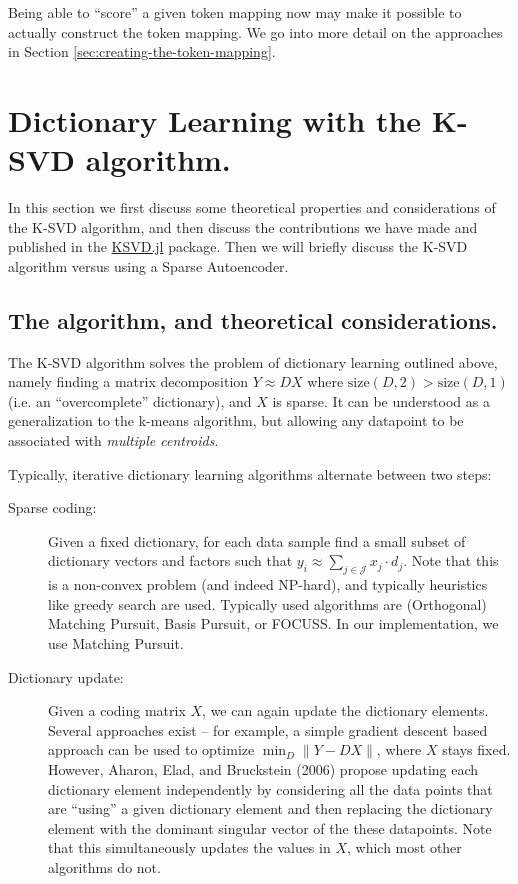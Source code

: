 \documentclass[11pt]{article}
\makeatletter
\newcommand{\cslcitation}[2]
 {\protect\hyper@linkstart{cite}{citeproc_bib_item_#1}#2\hyper@linkend}
\makeatother
\begin{document}
Being able to ``score'' a given token mapping now may make it possible to actually construct the token mapping.
We go into more detail on the approaches in Section \ref{sec:creating-the-token-mapping}.
\section{Dictionary Learning with the K-SVD algorithm. \label{sec:ksvd-algorithm}}
\label{sec:org5f20c96}
In this section we first discuss some theoretical properties and considerations of the K-SVD algorithm, and then discuss the contributions we have made and published in the \href{https://github.com/RomeoV/KSVD.jl}{KSVD.jl} package.
Then we will briefly discuss the K-SVD algorithm versus using a Sparse Autoencoder.
\subsection{The algorithm, and theoretical considerations.}
\label{sec:orge63f60f}
The K-SVD algorithm solves the problem of dictionary learning outlined above, namely finding a matrix decomposition \(Y \approx D X\) where \(\mathrm{size}(D, 2) > \mathrm{size}(D, 1)\) (i.e. an ``overcomplete'' dictionary), and \(X\) is sparse.
It can be understood as a generalization to the k-means algorithm, but allowing any datapoint to be associated with \emph{multiple centroids}.

Typically, iterative dictionary learning algorithms alternate between two steps:
\begin{description}
\item[{Sparse coding:}] Given a fixed dictionary, for each data sample find a small subset of dictionary vectors and factors such that \(y_i \approx \sum_{j \in \mathcal{J}} x_j \cdot d_j\).
Note that this is a non-convex problem (and indeed NP-hard), and typically heuristics like greedy search are used. Typically used algorithms are (Orthogonal) Matching Pursuit, Basis Pursuit, or FOCUSS.
In our implementation, we use Matching Pursuit.
\item[{Dictionary update:}] Given a coding matrix \(X\), we can again update the dictionary elements. Several approaches exist -- for example, a simple gradient descent based approach can be used to optimize \(\min_D \|Y - DX\|\), where \(X\) stays fixed.
However, Aharon, Elad, and Bruckstein (\cslcitation{1}{2006}) propose updating each dictionary element independently by considering all the data points that are ``using'' a given dictionary element and then replacing the dictionary element with the dominant singular vector of the these datapoints.
Note that this simultaneously updates the values in \(X\), which most other algorithms do not.
\end{description}
\end{document}
